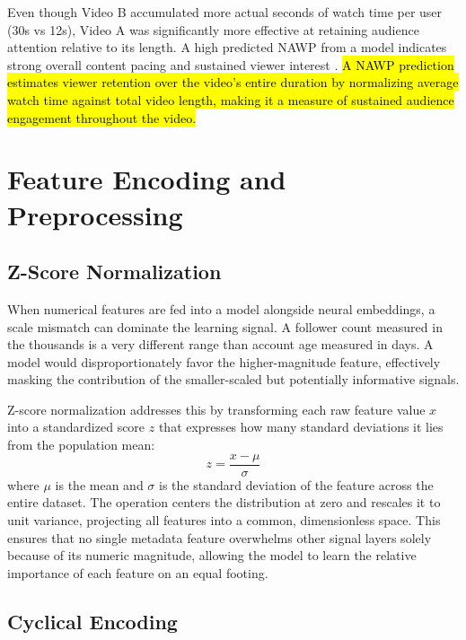 Even though Video B accumulated more actual seconds of watch time per user (30s vs 12s), Video A was significantly more effective at retaining audience attention relative to its length. A high predicted NAWP from a model indicates strong overall content pacing and sustained viewer interest \cite{manic2024short}. \hl{A NAWP prediction estimates viewer retention over the video's entire duration by normalizing average watch time against total video length, making it a measure of sustained audience engagement throughout the video.}

\section{Feature Encoding and Preprocessing}

\subsection{Z-Score Normalization}


When numerical features are fed into a model alongside neural embeddings, a scale mismatch can dominate the learning signal. A follower count measured in the thousands is a very different range than account age measured in days. A model would disproportionately favor the higher-magnitude feature, effectively masking the contribution of the smaller-scaled but potentially informative signals.

Z-score normalization addresses this by transforming each raw feature value $x$ into a standardized score $z$ that expresses how many standard deviations it lies from the population mean:
$$z = \frac{x - \mu}{\sigma}$$
where $\mu$ is the mean and $\sigma$ is the standard deviation of the feature across the entire dataset. The operation centers the distribution at zero and rescales it to unit variance, projecting all features into a common, dimensionless space. This ensures that no single metadata feature overwhelms other signal layers solely because of its numeric magnitude, allowing the model to learn the relative importance of each feature on an equal footing.

\subsection{Cyclical Encoding}

